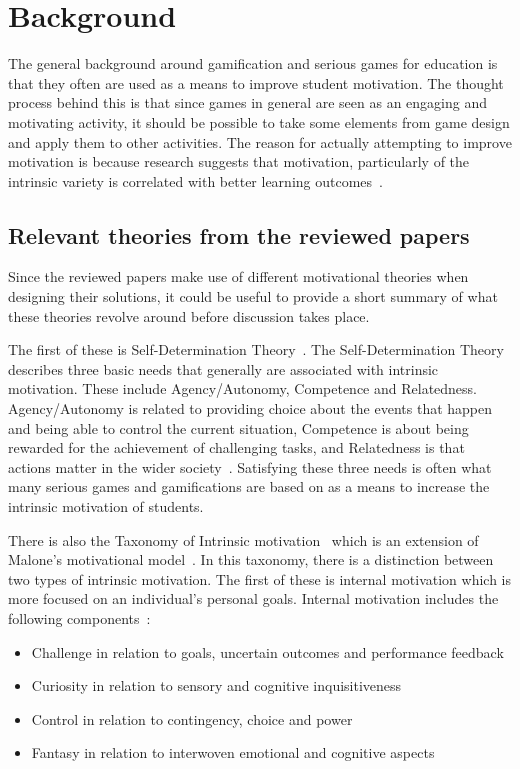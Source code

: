 \section{Background}
The general background around gamification and serious games for education is that they often are used as a means to improve student motivation. The thought process behind this is that since games in general are seen as an engaging and motivating activity, it should be possible to take some elements from game design and apply them to other activities. The reason for actually attempting to improve motivation is because research suggests that motivation, particularly of the intrinsic variety is correlated with better learning outcomes~\cite{ryan2000intrinsic}.

\subsection{Relevant theories from the reviewed papers}
Since the reviewed papers make use of different motivational theories when designing their solutions, it could be useful to provide a short summary of what these theories revolve around before discussion takes place.  

The first of these is Self-Determination Theory~\cite{ryan2000intrinsic}. The Self-Determination Theory describes three basic needs that generally are associated with intrinsic motivation. These include Agency/Autonomy, Competence and Relatedness. Agency/Autonomy is related to providing choice about the events that happen and being able to control the current situation, Competence is about being rewarded for the achievement of challenging tasks, and Relatedness is that actions matter in the wider society~\cite{simonSDTshort}. Satisfying these three needs is often what many serious games and gamifications are based on as a means to increase the intrinsic motivation of students. 
    
There is also the Taxonomy of Intrinsic motivation~\cite{maloneTax} which is an extension of Malone's motivational model~\cite{malone1981toward}. In this taxonomy, there is a distinction between two types of intrinsic motivation. The first of these is internal motivation which is more focused on an individual's personal goals. Internal motivation includes the following components~\cite{maloneTax, mozelius2014game}:

\begin{itemize}
    \item Challenge in relation to goals, uncertain outcomes and performance feedback
    \item Curiosity in relation to sensory and cognitive inquisitiveness
    \item Control in relation to contingency, choice and power
    \item Fantasy in relation to interwoven emotional and cognitive aspects
\end{itemize}

